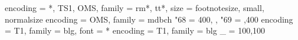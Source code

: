 

  { encoding = {*, TS1, OMS},
    family   = {rm*, tt*},
    size     = {footnotesize, small, normalsize} }
\SetProtrusion
  { encoding = OMS,
    family   = mdbch }
  { "68 = {400, },  %
    "69 = { ,400} } %
{}
  { encoding = T1,
    family   = blg, %
    font     = * }  %
\SetExtraKerning
  { encoding = T1,
    family   = blg }
  { _ = {100,100} } %


\linespread{1.2}

\everymath{\displaystyle}

\newenvironment{figuretable}[2][1em]
  {
    \begin{tabular}{*{#2}{c@{\hspace{#1}}}}
  }
  {
    \end{tabular}
  }

\tabcolsep=0pt

\newlength{\strutheight}
\settoheight{\strutheight}{\strut}

\renewcommand{\labelenumi}{(\alph{enumi})} %


\let\six=\si %


\newcommand{\difficulty}[1]{(#1)}



